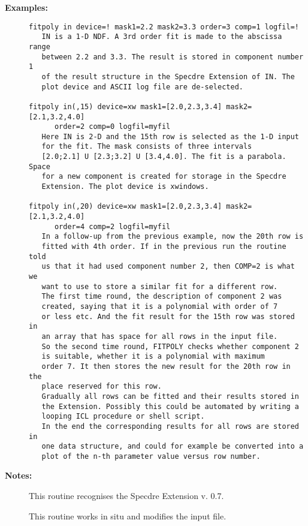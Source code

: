 \begin{description}
\begin{verbatim}
\end{verbatim}

\item [{\bf Examples:}]
\begin{verbatim}
fitpoly in device=! mask1=2.2 mask2=3.3 order=3 comp=1 logfil=!
   IN is a 1-D NDF. A 3rd order fit is made to the abscissa range
   between 2.2 and 3.3. The result is stored in component number 1
   of the result structure in the Specdre Extension of IN. The
   plot device and ASCII log file are de-selected.

fitpoly in(,15) device=xw mask1=[2.0,2.3,3.4] mask2=[2.1,3.2,4.0]
      order=2 comp=0 logfil=myfil
   Here IN is 2-D and the 15th row is selected as the 1-D input
   for the fit. The mask consists of three intervals
   [2.0;2.1] U [2.3;3.2] U [3.4,4.0]. The fit is a parabola. Space
   for a new component is created for storage in the Specdre
   Extension. The plot device is xwindows.

fitpoly in(,20) device=xw mask1=[2.0,2.3,3.4] mask2=[2.1,3.2,4.0]
      order=4 comp=2 logfil=myfil
   In a follow-up from the previous example, now the 20th row is
   fitted with 4th order. If in the previous run the routine told
   us that it had used component number 2, then COMP=2 is what we
   want to use to store a similar fit for a different row.
   The first time round, the description of component 2 was
   created, saying that it is a polynomial with order of 7
   or less etc. And the fit result for the 15th row was stored in
   an array that has space for all rows in the input file.
   So the second time round, FITPOLY checks whether component 2
   is suitable, whether it is a polynomial with maximum
   order 7. It then stores the new result for the 20th row in the
   place reserved for this row.
   Gradually all rows can be fitted and their results stored in
   the Extension. Possibly this could be automated by writing a
   looping ICL procedure or shell script.
   In the end the corresponding results for all rows are stored in
   one data structure, and could for example be converted into a
   plot of the n-th parameter value versus row number.
\end{verbatim}

\item [{\bf Notes:}]
This routine recognises the Specdre Extension v. 0.7.

This routine works in situ and modifies the input file.
\end{description}
